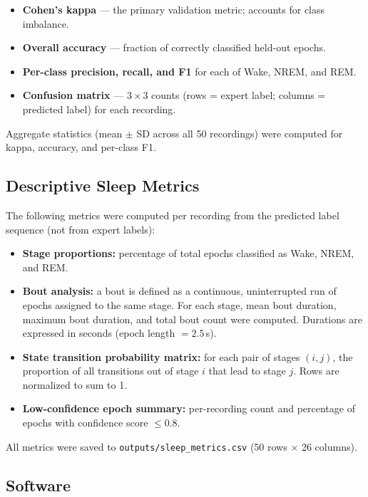 \documentclass[12pt,a4paper]{article}
\begin{document}
\begin{itemize}
  \item \textbf{Cohen's kappa} --- the primary validation metric; accounts for
    class imbalance.
  \item \textbf{Overall accuracy} --- fraction of correctly classified
    held-out epochs.
  \item \textbf{Per-class precision, recall, and F1} for each of Wake, NREM,
    and REM.
  \item \textbf{Confusion matrix} --- $3 \times 3$ counts (rows = expert label;
    columns = predicted label) for each recording.
\end{itemize}

Aggregate statistics (mean $\pm$ SD across all 50 recordings) were computed for
kappa, accuracy, and per-class F1.

\subsection{Descriptive Sleep Metrics}

The following metrics were computed per recording from the predicted label
sequence (not from expert labels):

\begin{itemize}
  \item \textbf{Stage proportions:} percentage of total epochs classified as
    Wake, NREM, and REM.
  \item \textbf{Bout analysis:} a bout is defined as a continuous, uninterrupted
    run of epochs assigned to the same stage. For each stage, mean bout duration,
    maximum bout duration, and total bout count were computed. Durations are
    expressed in seconds (epoch length $= 2.5$\,s).
  \item \textbf{State transition probability matrix:} for each pair of stages
    $(i, j)$, the proportion of all transitions out of stage $i$ that lead to
    stage $j$. Rows are normalized to sum to 1.
  \item \textbf{Low-confidence epoch summary:} per-recording count and
    percentage of epochs with confidence score $\leq 0.8$.
\end{itemize}

All metrics were saved to \texttt{outputs/sleep\_metrics.csv}
(50 rows $\times$ 26 columns).

\subsection{Software}
\end{document}
